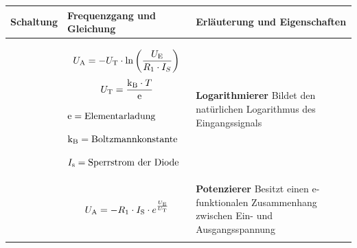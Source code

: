 \newpage
\begin{table}[ht]
    \begin{tabular}{|m{}|m{}|m{}|}
                \hline
        Schaltung & Frequenzgang und Gleichung & Erläuterung und Eigenschaften \\ %
        \hline
        
                  &
        \begin{center}
            \[
                U_{\textnormal{A}} =-U_{\textnormal{T}}\cdot \ln{\left(\frac{U_{\textnormal{E}}}{R_1\cdot I_S}\right)}
            \]
            \[
                U_{\textnormal{T}} = \frac{\textnormal{k}_{\textnormal{B}} \cdot T}{\textnormal{e}}
            \]

            \(\textnormal{e} = \text{Elementarladung}\)

            \(\textnormal{k}_{\textnormal{B}} = \text{Boltzmannkonstante}\)

            \(I_{\textnormal{s}} = \text{Sperrstrom der Diode}\)
        \end{center}
                  &
        \textbf{Logarithmierer}\newline
        \index{Operationsverstärker>Logarithmierer}
        Bildet den natürlichen Logarithmus des Eingangssignals
        \\
        \hline
        
                  &
        \begin{center}
            \[
                U_{\textnormal{A}} =-R_1\cdot I_{\textnormal{S}} \cdot e^{\frac{U_{\textnormal{E}}}{U_{\textnormal{T}}}}
            \]
        \end{center}
                  &
        \textbf{Potenzierer}\newline
        \index{Operationsverstärker>Potenzierer}
        Besitzt einen e-funktionalen Zusammenhang zwischen Ein- und Ausgangsspannung
        \\
        \hline
        
                  &
        \begin{center}
            
        \end{center}


\end{tabular}
\end{table}

